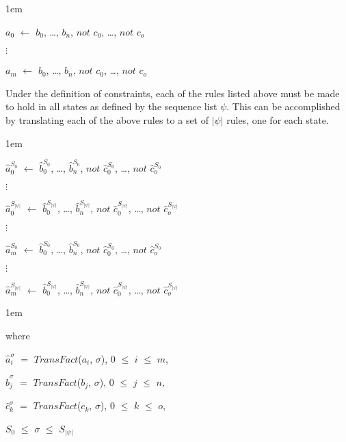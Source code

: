 \documentclass[global,twocolumn,final]{svjour}
\newenvironment{vquote}
  {\begin{list}{}{\leftmargin 1em}\item[]}
  {\end{list}}
\begin{document}
          \begin{vquote}
            $a_{0}$ $\leftarrow$
            $b_{0}$, \ldots, $b_{n}$,
            $not$ $c_{0}$, \ldots, $not$ $c_{o}$

            $\vdots$

            $a_{m}$ $\leftarrow$
            $b_{0}$, \ldots, $b_{n}$,
            $not$ $c_{0}$, \ldots, $not$ $c_{o}$
          \end{vquote}

          Under the definition of constraints, each of the rules listed above
          must be made to hold in all states as defined by the sequence list
          $\psi$. This can be accomplished by translating each of the above
          rules to a set of $|\psi|$ rules, one for each state.

           \begin{vquote}
            $\hat{a}^{S_{0}}_{0}$ $\leftarrow$
            $\hat{b}^{S_{0}}_{0}$, \ldots, $\hat{b}^{S_{0}}_{n}$,
            $not$ $\hat{c}^{S_{0}}_{0}$, \ldots, $not$ $\hat{c}^{S_{0}}_{o}$

            $\vdots$

            $\hat{a}^{S_{|\psi|}}_{0}$ $\leftarrow$
            $\hat{b}^{S_{|\psi|}}_{0}$, \ldots, $\hat{b}^{S_{|\psi|}}_{n}$,
            $not$ $\hat{c}^{S_{|\psi|}}_{0}$, \ldots, $not$ $\hat{c}^{S_{|\psi|}}_{o}$

            $\vdots$

            $\hat{a}^{S_{0}}_{m}$ $\leftarrow$
            $\hat{b}^{S_{0}}_{0}$, \ldots, $\hat{b}^{S_{0}}_{n}$,
            $not$ $\hat{c}^{S_{0}}_{0}$, \ldots, $not$ $\hat{c}^{S_{0}}_{o}$

            $\vdots$

            $\hat{a}^{S_{|\psi|}}_{m}$ $\leftarrow$
            $\hat{b}^{S_{|\psi|}}_{0}$, \ldots, $\hat{b}^{S_{|\psi|}}_{n}$,
            $not$ $\hat{c}^{S_{|\psi|}}_{0}$, \ldots, $not$ $\hat{c}^{S_{|\psi|}}_{o}$
          \end{vquote}

          \begin{vquote}
            where

            $\hat{a}^{\sigma}_{i}$ $=$ $TransFact$($a_{i}$, $\sigma$),
            $0$ $\leq$ $i$ $\leq$ $m$,

            $\hat{b}^{\sigma}_{j}$ $=$ $TransFact$($b_{j}$, $\sigma$),
            $0$ $\leq$ $j$ $\leq$ $n$,

            $\hat{c}^{\sigma}_{k}$ $=$ $TransFact$($c_{k}$, $\sigma$),
            $0$ $\leq$ $k$ $\leq$ $o$,

            $S_{0}$ $\leq$ $\sigma$ $\leq$ $S_{|\psi|}$
          \end{vquote}
\end{document}
